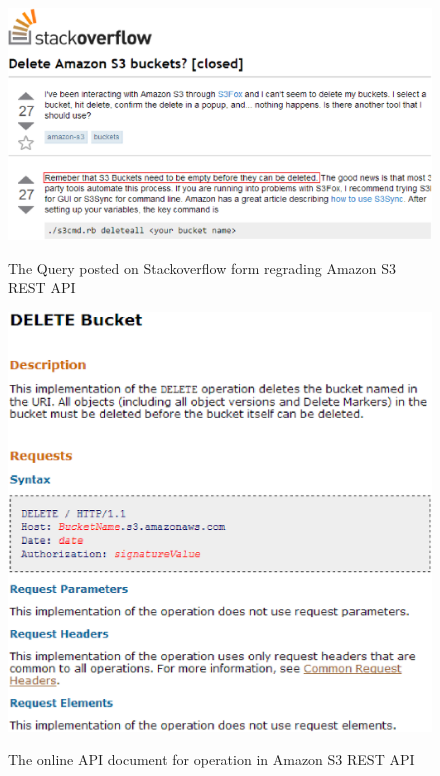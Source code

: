 \begin{figure}[t]
\begin{CodeOut}
\begin{alltt}
\includegraphics[scale=0.4]{Stackoverflow.eps}
\end{alltt}
\end{CodeOut}
\caption{\label{fig:Stackoverflow} The Query posted on Stackoverflow form regrading Amazon S3 REST API}
\end{figure}

\begin{figure}[t]
\begin{CodeOut}
\begin{alltt}
\includegraphics[scale=0.4]{AmzonS3DeleteBucketAPI.eps}
\end{alltt}
\end{CodeOut}
\caption{\label{fig:AmzonS3DeleteBucketAPI} The online API document for  operation in Amazon S3 REST API}
\end{figure}



